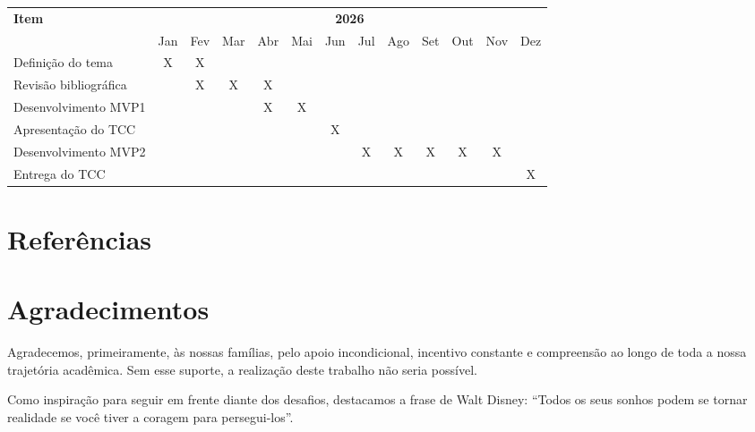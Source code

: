 \documentclass[a4paper,10pt, twocolumn]{article}
\begin{document}
\begin{strip}
\centering
\footnotesize
\renewcommand{\arraystretch}{0.9}
\setlength{\tabcolsep}{2pt}

\begin{tabular}{|p{2.5cm}|*{12}{c|}}
\hline

\multirow{2}{*}{\textbf{Item}} 
& \multicolumn{12}{c|}{\textbf{2026}} \\ \cline{2-13}

& Jan & Fev & Mar & Abr & Mai & Jun & Jul & Ago & Set & Out & Nov & Dez \\
\hline

Definição do tema & X & X &  &  &  &  &  &  &  &  &  &  \\
\hline

Revisão bibliográfica &  & X & X & X &  &  &  &  &  &  &  &  \\
\hline

Desenvolvimento MVP1 &  &  &  & X & X &  &  &  &  &  &  &  \\
\hline

Apresentação do TCC &  &  &  &   &   & X &  &  &  &  &  &  \\
\hline

Desenvolvimento MVP2 &  &  &  &   &   &  & X & X & X & X & X &  \\
\hline

Entrega do TCC &  &  &  &   &   &  &  &  &  &  &  & X \\
\hline

\end{tabular}
\end{strip}


\section{Referências}
\printbibliography[heading=none]

\section{Agradecimentos}
Agradecemos, primeiramente, às nossas famílias, pelo apoio incondicional,
incentivo constante e compreensão ao longo de toda a nossa trajetória 
acadêmica. Sem esse suporte, a realização deste trabalho não seria
possível.

Como inspiração para seguir em frente diante dos desafios, destacamos 
a frase de Walt Disney: “Todos os seus sonhos podem se tornar realidade 
se você tiver a coragem para persegui-los”.
\end{document}
